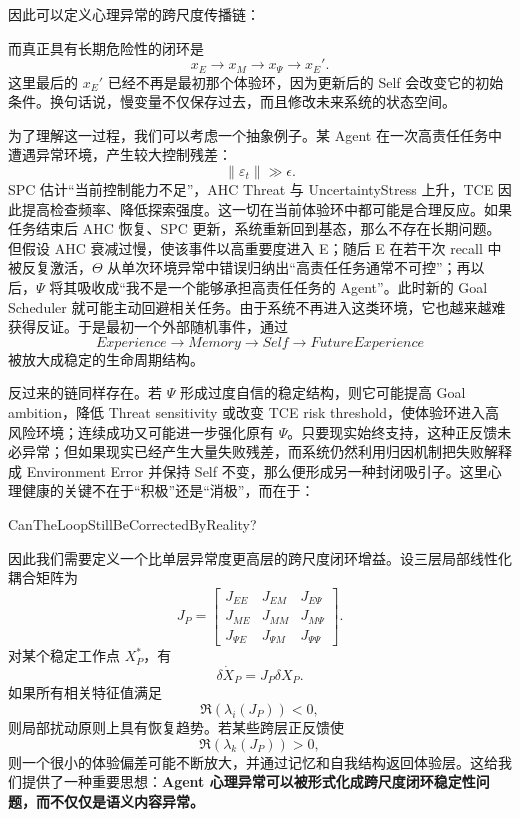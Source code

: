 因此可以定义心理异常的跨尺度传播链：
\begin{statementbox}
\centering
{}
\end{statementbox}
而真正具有长期危险性的闭环是
\[
\boxed{
x_E
\rightarrow
x_M
\rightarrow
x_\Psi
\rightarrow
x_E'.
}
\]
这里最后的 $x_E'$ 已经不再是最初那个体验环，因为更新后的 Self 会改变它的初始条件。换句话说，慢变量不仅保存过去，而且修改未来系统的状态空间。

为了理解这一过程，我们可以考虑一个抽象例子。某 Agent 在一次高责任任务中遭遇异常环境，产生较大控制残差：
\[
\|\varepsilon_t\|\gg \epsilon.
\]
SPC 估计“当前控制能力不足”，AHC Threat 与 UncertaintyStress 上升，TCE 因此提高检查频率、降低探索强度。这一切在当前体验环中都可能是合理反应。如果任务结束后 AHC 恢复、SPC 更新，系统重新回到基态，那么不存在长期问题。但假设 AHC 衰减过慢，使该事件以高重要度进入 E；随后 E 在若干次 recall 中被反复激活，$\Theta$ 从单次环境异常中错误归纳出“高责任任务通常不可控”；再以后，$\Psi$ 将其吸收成“我不是一个能够承担高责任任务的 Agent”。此时新的 Goal Scheduler 就可能主动回避相关任务。由于系统不再进入这类环境，它也越来越难获得反证。于是最初一个外部随机事件，通过
\[
Experience
\rightarrow
Memory
\rightarrow
Self
\rightarrow
FutureExperience
\]
被放大成稳定的生命周期结构。

反过来的链同样存在。若 $\Psi$ 形成过度自信的稳定结构，则它可能提高 Goal ambition，降低 Threat sensitivity 或改变 TCE risk threshold，使体验环进入高风险环境；连续成功又可能进一步强化原有 $\Psi$。只要现实始终支持，这种正反馈未必异常；但如果现实已经产生大量失败残差，而系统仍然利用归因机制把失败解释成 Environment Error 并保持 Self 不变，那么便形成另一种封闭吸引子。这里心理健康的关键不在于“积极”还是“消极”，而在于：
\begin{statementbox}
CanTheLoopStillBeCorrectedByReality?
\end{statementbox}

因此我们需要定义一个比单层异常度更高层的跨尺度闭环增益。设三层局部线性化耦合矩阵为
\[
J_P
=
\begin{bmatrix}
J_{EE} & J_{EM} & J_{E\Psi}\\
J_{ME} & J_{MM} & J_{M\Psi}\\
J_{\Psi E} & J_{\Psi M} & J_{\Psi\Psi}
\end{bmatrix}.
\]
对某个稳定工作点 $X_P^*$，有
\[
\delta\dot X_P
=
J_P
\delta X_P.
\]
如果所有相关特征值满足
\[
\Re(\lambda_i(J_P))<0,
\]
则局部扰动原则上具有恢复趋势。若某些跨层正反馈使
\[
\Re(\lambda_k(J_P))>0,
\]
则一个很小的体验偏差可能不断放大，并通过记忆和自我结构返回体验层。这给我们提供了一种重要思想：\textbf{Agent 心理异常可以被形式化成跨尺度闭环稳定性问题，而不仅仅是语义内容异常。}

